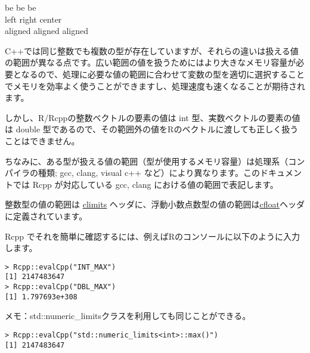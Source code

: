 \documentclass[]{book}
\begin{document}
be \textbar{} be \textbar{} be \textbar{}\\
left \textbar{} right \textbar{} center \textbar{}\\
aligned \textbar{} aligned \textbar{} aligned \textbar{}

C++では同じ整数でも複数の型が存在していますが、それらの違いは扱える値の範囲が異なる点です。広い範囲の値を扱うためにはより大きなメモリ容量が必要となるので、処理に必要な値の範囲に合わせて変数の型を適切に選択することでメモリを効率よく使うことができますし、処理速度も速くなることが期待されます。

しかし、R/Rcppの整数ベクトルの要素の値は int
型、実数ベクトルの要素の値は double
型であるので、その範囲外の値をRのベクトルに渡しても正しく扱うことはできません。

ちなみに、ある型が扱える値の範囲（型が使用するメモリ容量）は処理系（コンパイラの種類;
gcc, clang, visual c++ など）により異なります。このドキュメントでは Rcpp
が対応している gcc, clang における値の範囲で表記します。

整数型の値の範囲は
\href{https://cpprefjp.github.io/reference/climits.html}{climits}
ヘッダに、浮動小数点数型の値の範囲は\href{https://cpprefjp.github.io/reference/cfloat.html}{cfloat}ヘッダに定義されています。

Rcpp
でそれを簡単に確認するには、例えばRのコンソールに以下のように入力します。

\begin{verbatim}
> Rcpp::evalCpp("INT_MAX")
[1] 2147483647
> Rcpp::evalCpp("DBL_MAX")
[1] 1.797693e+308
\end{verbatim}

メモ：std::numeric\_limitsクラスを利用しても同じことができる。

\begin{verbatim}
> Rcpp::evalCpp("std::numeric_limits<int>::max()")
[1] 2147483647
\end{verbatim}
\end{document}
